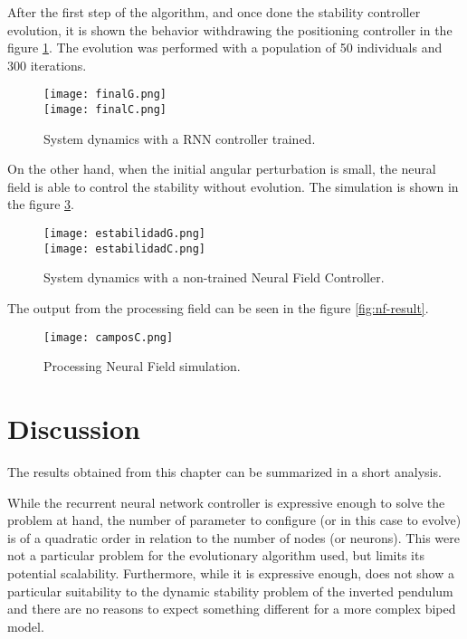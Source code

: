 After the first step of the algorithm, and once done the stability
controller evolution, it is shown the behavior withdrawing the
positioning controller in the figure \ref{final}. The evolution was performed with a population
of 50 individuals and 300 iterations.

\begin{figure}[t]
\centering
\texttt{[image: finalG.png]}
\\
\texttt{[image: finalC.png]}
\caption{System dynamics with a RNN controller trained.}
\label{final}
\end{figure}

On the other hand, when the initial angular perturbation is small, the
neural field is able to control the stability without evolution. The
simulation is shown in the figure \ref{estabilidad}.


\begin{figure}[t]
\centering
\texttt{[image: estabilidadG.png]}
\\
\texttt{[image: estabilidadC.png]}
\caption{System dynamics with a non-trained Neural Field Controller.}
\label{estabilidad}
\end{figure}

The output from the processing field can be seen in the figure
\ref{fig:nf-result}.


\begin{figure}[t]
\centering
\texttt{[image: camposC.png]}
\caption{Processing Neural Field simulation.}
\label{estabilidad}
\end{figure}



\section{Discussion}
The results obtained from this chapter can be summarized in a short
analysis. 

While the recurrent neural network controller is expressive
enough to solve the problem at hand, the number of parameter to
configure (or in this case to evolve) is of a quadratic order in
relation to the number of nodes (or neurons). This were not a
particular problem for the evolutionary algorithm used, but limits its
potential scalability. Furthermore, while it is expressive enough,
does not show a particular suitability to the dynamic stability
problem of the inverted pendulum and there are no reasons to expect
something different for a more complex biped model. 

